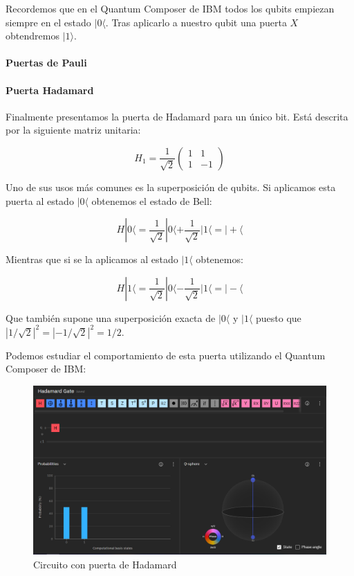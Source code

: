 \documentclass[11pt]{article}
\newcommand{\ra}{\rangle}
\newcommand{\la}{\langle}
\begin{document}
Recordemos que en el Quantum Composer de IBM todos los qubits empiezan siempre en el estado $|0\la$. Tras aplicarlo a nuestro qubit una puerta $X$ obtendremos $|1\ra$.

\paragraph*{Puertas de Pauli}



\paragraph*{Puerta Hadamard}

Finalmente presentamos la puerta de Hadamard para un único bit. Está descrita por la siguiente matriz unitaria:

\[
	H_1 = \frac{1}{\sqrt 2}
	\begin{pmatrix}
		1 & 1 \\
		1 & -1 
	\end{pmatrix}
\]

Uno de sus usos más comunes es la superposición de qubits. Si aplicamos esta puerta al estado $|0\la$ obtenemos el estado de Bell:

\[
	H|0\la = \frac{1}{\sqrt 2} |0\la + \frac{1}{\sqrt 2} |1\la = |+\la
\]

Mientras que si se la aplicamos al estado $|1\la$ obtenemos:

\[
	H|1\la = \frac{1}{\sqrt 2} |0\la - \frac{1}{\sqrt 2} |1\la = |-\la
\]

Que también supone una superposición exacta de $|0\la$ y $|1\la$ puesto que $|1/\sqrt 2|^2 = |-1/\sqrt 2|^2 = 1/2$.

Podemos estudiar el comportamiento de esta puerta utilizando el Quantum Composer de IBM:

\begin{figure}[H]
	\centering
	\includegraphics[scale=0.4]{figures/gate-hadamard.png}
	\caption{Circuito con puerta de Hadamard}
\end{figure}
\end{document}
